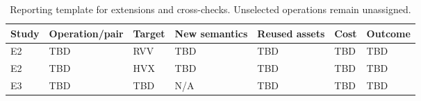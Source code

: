 \begin{table}[htbp]
\centering
\small
\caption{Reporting template for extensions and cross-checks. Unselected operations remain unassigned.}
\label{tab:extension}
\begin{tabular}{@{}lllllll@{}}
\toprule
Study & Operation/pair & Target & New semantics & Reused assets & Cost & Outcome \\
\midrule
E2 & TBD & RVV & TBD & TBD & TBD & TBD \\
E2 & TBD & HVX & TBD & TBD & TBD & TBD \\
E3 & TBD & TBD & N/A & TBD & TBD & TBD \\
\bottomrule
\end{tabular}
\end{table}
